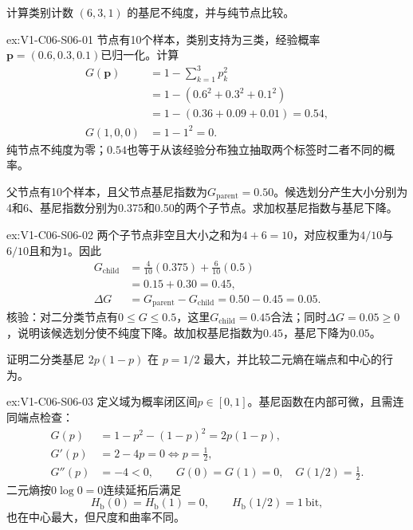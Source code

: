 \begin{SLChapterExercisePairSection}
\begin{exercise}\label{ex:V1-C06-S06-01}
计算类别计数 $(6,3,1)$ 的基尼不纯度，并与纯节点比较。
\end{exercise}
\label{sol:V1-C06-S06-01}
\begin{chapterexercisesolution}{ex:V1-C06-S06-01}
节点有10个样本，类别支持为三类，经验概率$\boldsymbol p=(0.6,0.3,0.1)$已归一化。计算
\[
\begin{aligned}
G(\boldsymbol p)
&=1-\sum_{k=1}^3p_k^2\\
&=1-(0.6^2+0.3^2+0.1^2)\\
&=1-(0.36+0.09+0.01)=0.54,\\
G(1,0,0)&=1-1^2=0.
\end{aligned}
\]
纯节点不纯度为零；$0.54$也等于从该经验分布独立抽取两个标签时二者不同的概率。
\end{chapterexercisesolution}

\begin{exercise}\label{ex:V1-C06-S06-02}
父节点有10个样本，且父节点基尼指数为$G_{\mathrm{parent}}=0.50$。候选划分产生大小分别为4和6、基尼指数分别为0.375和0.50的两个子节点。求加权基尼指数与基尼下降。
\end{exercise}
\label{sol:V1-C06-S06-02}
\begin{chapterexercisesolution}{ex:V1-C06-S06-02}
两个子节点非空且大小之和为$4+6=10$，对应权重为$4/10$与$6/10$且和为$1$。因此
\[
\begin{aligned}
G_{\mathrm{child}}
&=\frac4{10}(0.375)+\frac6{10}(0.5)\\
&=0.15+0.30=0.45,\\
\Delta G&=G_{\mathrm{parent}}-G_{\mathrm{child}}
=0.50-0.45=0.05.
\end{aligned}
\]
核验：对二分类节点有$0\le G\le0.5$，这里$G_{\mathrm{child}}=0.45$合法；同时$\Delta G=0.05\ge0$，说明该候选划分使不纯度下降。故加权基尼指数为$0.45$，基尼下降为$0.05$。
\end{chapterexercisesolution}

\begin{exercise}\label{ex:V1-C06-S06-03}
证明二分类基尼 $2p(1-p)$ 在 $p=1/2$ 最大，并比较二元熵在端点和中心的行为。
\end{exercise}
\label{sol:V1-C06-S06-03}
\begin{chapterexercisesolution}{ex:V1-C06-S06-03}
定义域为概率闭区间$p\in[0,1]$。基尼函数在内部可微，且需连同端点检查：
\[
\begin{aligned}
G(p)&=1-p^2-(1-p)^2=2p(1-p),\\
G'(p)&=2-4p=0\Longleftrightarrow p=\frac12,\\
G''(p)&=-4<0,\qquad
G(0)=G(1)=0,\quad G(1/2)=\frac12.
\end{aligned}
\]
二元熵按$0\log0=0$连续延拓后满足
\[
H_{\mathrm b}(0)=H_{\mathrm b}(1)=0,\qquad
H_{\mathrm b}(1/2)=1\ \text{bit},
\]
也在中心最大，但尺度和曲率不同。
\end{chapterexercisesolution}

\end{SLChapterExercisePairSection}

